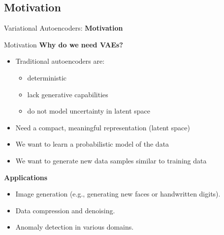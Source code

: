 \subsection{Motivation}
\begin{frame}{}
    \LARGE Variational Autoencoders: \textbf{Motivation}
\end{frame}

\begin{frame}[allowframebreaks]{Motivation}
    \textbf{Why do we need VAEs?}
    \begin{itemize}
        \item Traditional autoencoders are:
        \begin{itemize}
            \item deterministic 
            \item lack generative capabilities
            \item do not model uncertainty in latent space
        \end{itemize}
        \item Need a compact, meaningful representation (latent space)
        \item We want to learn a probabilistic model of the data
        \item We want to generate new data samples similar to training data
    \end{itemize}

    \framebreak

    \textbf{Applications}
    \begin{itemize}
        \item Image generation (e.g., generating new faces or handwritten digits).
        \item Data compression and denoising.
        \item Anomaly detection in various domains.
    \end{itemize}
\end{frame}